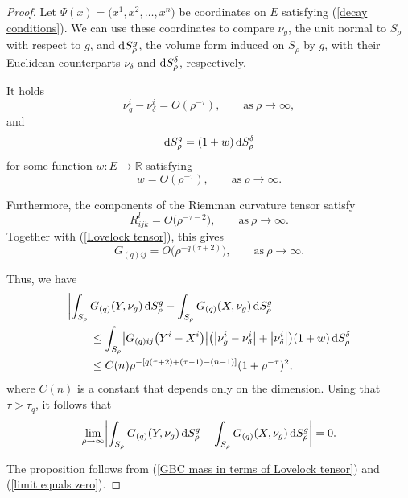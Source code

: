 \documentclass[pdftex]{sigma}
\numberwithin{equation}{section}
\begin{document}
\begin{proof}
   Let $\Psi(x) = \bigl(x^1, x^2, \ldots, x^n\bigr)$ be coordinates on $E$ satisfying (\ref{decay conditions}). We can use these coordinates to compare $\nu_g$, the unit normal to $S_\rho$ with respect to $g$, and ${\rm d}S_\rho^g$, the volume form induced on $S_\rho$ by $g$, with their Euclidean counterparts $\nu_\delta$ and ${\rm d}S_\rho^\delta$, respectively.

  It holds
  \begin{equation*}
    \nu_g^i - \nu_\delta^i = O(\rho^{-\tau}),\qquad \text{as}\ \rho \to \infty,
  \end{equation*}
  and
  \begin{equation*}
    {\rm d}S_\rho^g = (1+w) \, {\rm d}S_\rho^\delta
  \end{equation*}
  for some function $w\colon E \to \mathbb{R}$ satisfying
  \begin{equation*}
    w = O(\rho^{-\tau}),\qquad \text{as} \ \rho \to \infty.
  \end{equation*}

  Furthermore, the components of the Riemman curvature tensor satisfy
  \begin{equation*}
    R^l_{ijk} = O\bigl(\rho^{-\tau - 2}\bigr), \qquad \text{as} \  \rho \to \infty.
  \end{equation*}
  Together with (\ref{Lovelock tensor}), this gives
  \begin{equation*}
  G_{(q)ij} = O\bigl(\rho^{-q(\tau + 2)}\bigr), \qquad \text{as} \  \rho \to \infty.
  \end{equation*}

  Thus, we have
  \begin{align*}
    &\biggl| \int_{S_\rho} G_{(q)}(Y,\nu_g) \, {\rm d}S_\rho^g - \int_{S_\rho} G_{(q)}(X,\nu_g) \, {\rm d}S_\rho^g \biggr| \\
     &\qquad{} \leq \int_{S_\rho} \bigl| G_{(q)ij}\bigl(Y^i - X^i\bigr)\bigr| \bigl(\bigl|\nu_g^i - \nu_\delta^i\bigr| + \bigl|\nu_\delta^i\bigr|\bigr)(1 + w)\, {\rm d}S_\rho^\delta \\
     &\qquad{} \leq C(n) \rho^{-[q(\tau + 2) + (\tau - 1) - (n-1)]}(1 + \rho^{-\tau})^2,
  \end{align*}
where $C(n)$ is a constant that depends only on the dimension.
  Using that $\tau > \tau_q$, it follows that%
  \begin{equation} \label{limit equals zero}
  \lim_{\rho \to \infty}  \biggl| \int_{S_\rho} G_{(q)}(Y,\nu_g) \, {\rm d}S_\rho^g -\int_{S_\rho} G_{(q)}(X,\nu_g) \, {\rm d}S_\rho^g \biggr| = 0.
  \end{equation}

The proposition follows from (\ref{GBC mass in terms of Lovelock tensor}) and (\ref{limit equals zero}).
\end{proof}
\end{document}
